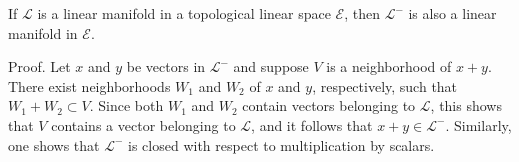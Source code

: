 If $\mathcal{L}$ is a linear manifold in a topological linear space $\mathcal{E}$, then $\mathcal{L}^-$ is also a linear manifold in $\mathcal{E}$.

Proof. Let $x$ and $y$ be vectors in $\mathcal{L}^-$ and suppose $V$ is a neighborhood of $x + y$. There exist neighborhoods $W_1$ and $W_2$ of $x$ and $y$, respectively, such that $W_1 + W_2 \subset V$. Since both $W_1$ and $W_2$ contain vectors belonging to $\mathcal{L}$, this shows that $V$ contains a vector belonging to $\mathcal{L}$, and it follows that $x + y \in \mathcal{L}^-$. Similarly, one shows that $\mathcal{L}^-$ is closed with respect to multiplication by scalars.
